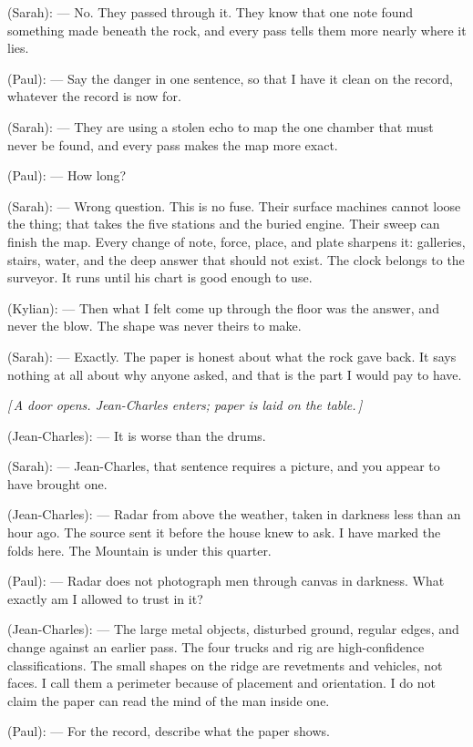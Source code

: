 \begin{room}
(Sarah): --- No. They passed through it. They know that one note found something made beneath the rock, and every pass tells them more nearly where it lies.

(Paul): --- Say the danger in one sentence, so that I have it clean on the record, whatever the record is now for.

(Sarah): --- They are using a stolen echo to map the one chamber that must never be found, and every pass makes the map more exact.

(Paul): --- How long?

(Sarah): --- Wrong question. This is no fuse. Their surface machines cannot loose the thing; that takes the five stations and the buried engine. Their sweep can finish the map. Every change of note, force, place, and plate sharpens it: galleries, stairs, water, and the deep answer that should not exist. The clock belongs to the surveyor. It runs until his chart is good enough to use.

(Kylian): --- Then what I felt come up through the floor was the answer, and never the blow. The shape was never theirs to make.

(Sarah): --- Exactly. The paper is honest about what the rock gave back. It says nothing at all about why anyone asked, and that is the part I would pay to have.

\centerline{\textit{[\,A door opens. Jean-Charles enters; paper is laid on the table.\,]}}

(Jean-Charles): --- It is worse than the drums.

(Sarah): --- Jean-Charles, that sentence requires a picture, and you appear to have brought one.

(Jean-Charles): --- Radar from above the weather, taken in darkness less than an hour ago. The source sent it before the house knew to ask. I have marked the folds here. The Mountain is under this quarter.

(Paul): --- Radar does not photograph men through canvas in darkness. What exactly am I allowed to trust in it?

(Jean-Charles): --- The large metal objects, disturbed ground, regular edges, and change against an earlier pass. The four trucks and rig are high-confidence classifications. The small shapes on the ridge are revetments and vehicles, not faces. I call them a perimeter because of placement and orientation. I do not claim the paper can read the mind of the man inside one.

(Paul): --- For the record, describe what the paper shows.


\end{room}
